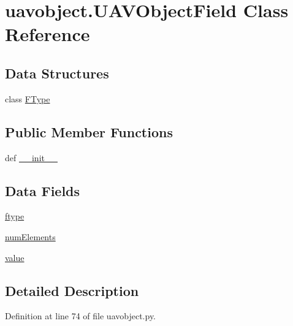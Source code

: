 \hypertarget{classuavobject_1_1_u_a_v_object_field}{\section{uavobject.\-U\-A\-V\-Object\-Field \-Class \-Reference}
\label{classuavobject_1_1_u_a_v_object_field}
}
\subsection*{\-Data \-Structures}
\begin{DoxyCompactItemize}
\item 
class \hyperlink{classuavobject_1_1_u_a_v_object_field_1_1_f_type}{\-F\-Type}
\end{DoxyCompactItemize}
\subsection*{\-Public \-Member \-Functions}
\begin{DoxyCompactItemize}
\item 
def \hyperlink{classuavobject_1_1_u_a_v_object_field_acf43e94abcf1a399fa8ca600c45e9415}{\-\_\-\-\_\-init\-\_\-\-\_\-}
\end{DoxyCompactItemize}
\subsection*{\-Data \-Fields}
\begin{DoxyCompactItemize}
\item 
\hyperlink{classuavobject_1_1_u_a_v_object_field_adbc4d62d21f682b85bd29ce9d4f32aa6}{ftype}
\item 
\hyperlink{classuavobject_1_1_u_a_v_object_field_a02814b59debbda2c3e5df04685e7fa24}{num\-Elements}
\item 
\hyperlink{classuavobject_1_1_u_a_v_object_field_a0fb06dc8a6e619248bd22427a2263e6a}{value}
\end{DoxyCompactItemize}


\subsection{\-Detailed \-Description}


\-Definition at line 74 of file uavobject.\-py.



